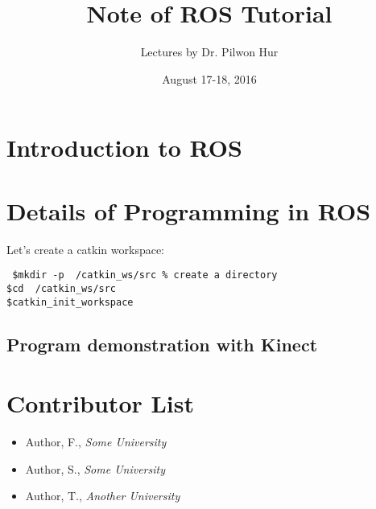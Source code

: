 \documentclass{article}
\title{Note of ROS Tutorial}
\author{Lectures by Dr. Pilwon Hur}
\date{August 17-18, 2016}
\begin{document}
\maketitle
\section{Introduction to ROS}








\section{Details of Programming in ROS}



Let's create a catkin workspace:
\begin{shaded}
\noindent\texttt{\noindent
	\$\quad mkdir -p ~/catkin\_ws/src \quad \% create a directory\\
	 \$\quad cd ~/catkin\_ws/src\\
	 \$\quad catkin\_init\_workspace}	 
\end{shaded}

\subsection{Program demonstration with Kinect}


\section*{Contributor List}
\begin{itemize}

  \item Author, F., \textit {Some University}
  \item Author, S., \textit {Some University}
  \item Author, T., \textit {Another University}
\end{itemize}



%
\end{document}
